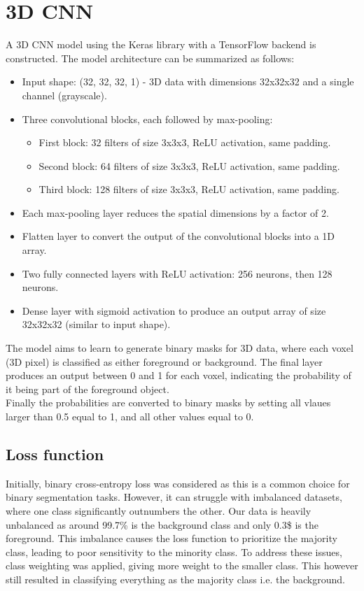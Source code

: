 \documentclass[a4]{article}
\begin{document}
\section{3D CNN}

A 3D CNN model using the Keras library with a TensorFlow backend is constructed. The model architecture can be summarized as follows:
\begin{itemize}
    \item Input shape: (32, 32, 32, 1) - 3D data with dimensions 32x32x32 and a single channel (grayscale).
\item Three convolutional blocks, each followed by max-pooling:
\begin{itemize}
    \item First block: 32 filters of size 3x3x3, ReLU activation, same padding.
    \item Second block: 64 filters of size 3x3x3, ReLU activation, same padding.
    \item Third block: 128 filters of size 3x3x3, ReLU activation, same padding.
\end{itemize} 
\item Each max-pooling layer reduces the spatial dimensions by a factor of 2.
\item Flatten layer to convert the output of the convolutional blocks into a 1D array.
\item Two fully connected layers with ReLU activation: 256 neurons, then 128 neurons.
\item Dense layer with sigmoid activation to produce an output array of size 32x32x32 (similar to input shape).
\end{itemize}
The model aims to learn to generate binary masks for 3D data, where each voxel (3D pixel) is classified as either foreground or background. The final layer produces an output between 0 and 1 for each voxel, indicating the probability of it being part of the foreground object.\\
Finally the probabilities are converted to binary masks by setting all vlaues larger than 0.5 equal to 1, and all other values equal to 0.
\subsection{Loss function}
Initially, binary cross-entropy loss was considered as this is a common choice for binary segmentation tasks. However, it can struggle with imbalanced datasets, where one class significantly outnumbers the other. Our data is heavily unbalanced as around 99.7\% is the background class and only 0.3\$ is the foreground. This imbalance causes the loss function to prioritize the majority class, leading to poor sensitivity to the minority class. To address these issues, class weighting was applied, giving more weight to the smaller class. This however still resulted in classifying everything as the majority class i.e. the background.\\
\end{document}
